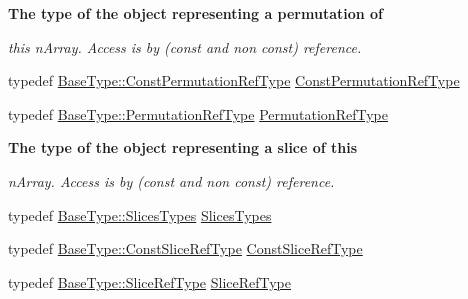 \begin{Indent}{\bf The type of the object representing a permutation of}\par
{\em this n\+Array. Access is by (const and non const) reference. }\begin{DoxyCompactItemize}
\item 
typedef \hyperlink{classvct_dynamic_const_n_array_base_a412fcb88d50ea2e1d809efab113968fc}{Base\+Type\+::\+Const\+Permutation\+Ref\+Type} \hyperlink{classvct_dynamic_n_array_base_a8e5f4edd6bbaaa0650c24f464a5c13b6}{Const\+Permutation\+Ref\+Type}
\item 
typedef \hyperlink{classvct_dynamic_const_n_array_base_a968acf814b972b47aa2ea39105e67fb3}{Base\+Type\+::\+Permutation\+Ref\+Type} \hyperlink{classvct_dynamic_n_array_base_a32a4177a0764b9b796ed4c41fbd8c2ad}{Permutation\+Ref\+Type}
\end{DoxyCompactItemize}
\end{Indent}
\begin{Indent}{\bf The type of the object representing a slice of this}\par
{\em n\+Array. Access is by (const and non const) reference. }\begin{DoxyCompactItemize}
\item 
typedef \hyperlink{classvct_dynamic_const_n_array_base_a1f4ce8ed9fda0d5d1704f66799a55279}{Base\+Type\+::\+Slices\+Types} \hyperlink{classvct_dynamic_n_array_base_a4f034b6fdba4c573c4f5da7cb913fb54}{Slices\+Types}
\item 
typedef \hyperlink{classvct_dynamic_const_n_array_base_ad4a09eb0789ba4c5b8d799fbe0ee3d79}{Base\+Type\+::\+Const\+Slice\+Ref\+Type} \hyperlink{classvct_dynamic_n_array_base_ac83089be31d75a0a4c8ef603506f820f}{Const\+Slice\+Ref\+Type}
\item 
typedef \hyperlink{classvct_dynamic_const_n_array_base_a4170184942c320b2402ba8dfdab9a915}{Base\+Type\+::\+Slice\+Ref\+Type} \hyperlink{classvct_dynamic_n_array_base_aca69a8c3c62f1db0703198aa955d6157}{Slice\+Ref\+Type}
\end{DoxyCompactItemize}
\end{Indent}
